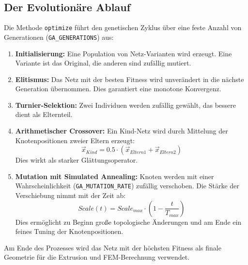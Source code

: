 \documentclass[a4paper,12pt]{article}
\begin{document}
\subsection{Der Evolutionäre Ablauf}
Die Methode \texttt{optimize} führt den genetischen Zyklus über eine feste Anzahl von Generationen (\texttt{GA\_GENERATIONS}) aus:

\begin{enumerate}
    \item \textbf{Initialisierung:} Eine Population von Netz-Varianten wird erzeugt. Eine Variante ist das Original, die anderen sind zufällig mutiert.
    \item \textbf{Elitismus:} Das Netz mit der besten Fitness wird unverändert in die nächste Generation übernommen. Dies garantiert eine monotone Konvergenz.
    \item \textbf{Turnier-Selektion:} Zwei Individuen werden zufällig gewählt, das bessere dient als Elternteil.
    \item \textbf{Arithmetischer Crossover:} Ein Kind-Netz wird durch Mittelung der Knotenpositionen zweier Eltern erzeugt:
    \begin{equation}
        \vec{x}_{Kind} = 0.5 \cdot (\vec{x}_{Eltern1} + \vec{x}_{Eltern2})
    \end{equation}
    Dies wirkt als starker Glättungsoperator.
    \item \textbf{Mutation mit Simulated Annealing:} Knoten werden mit einer Wahrscheinlichkeit (\texttt{GA\_MUTATION\_RATE}) zufällig verschoben. Die Stärke der Verschiebung nimmt mit der Zeit ab:
    \begin{equation}
        Scale(t) = Scale_{max} \cdot \left(1 - \frac{t}{T_{max}}\right)
    \end{equation}
    Dies ermöglicht zu Beginn große topologische Änderungen und am Ende ein feines Tuning der Knotenpositionen.
\end{enumerate}

Am Ende des Prozesses wird das Netz mit der höchsten Fitness als finale Geometrie für die Extrusion und FEM-Berechnung verwendet.
\end{document}
